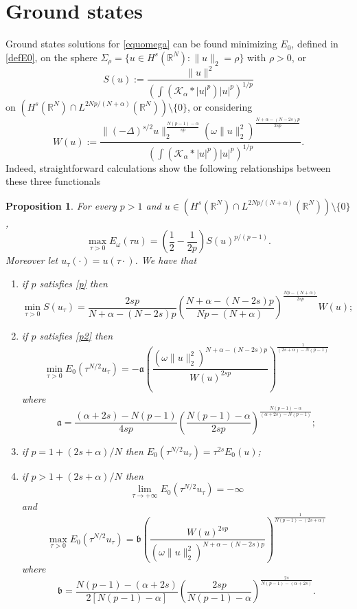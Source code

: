 \documentclass[10pt]{amsart}
\numberwithin{equation}{section}
\newtheorem{proposition}[theorem]{Proposition}
\begin{document}
\section{Ground states}
\label{sec:gs}
\noindent
Ground states solutions for \eqref{equomega} can be found minimizing $E_0$, defined in \eqref{defE0}, on the sphere $\Sigma_{\rho}=\{ u\in {H^{s}(\mathbb R^{N})} : \|u\|_{2}=\rho\}$ with $\rho>0$, or
\[
S(u):=\frac{\|u\|^{2}}
{\left(\int ({\mathcal K}_\alpha *|u|^p )|u|^{p}\right)^{1/p}}
\]
on $({H^{s}(\mathbb R^{N})}\cap L^{2Np/(N+\alpha)}(\mathbb{R}^N))\setminus\{0\}$, or considering 
\[
W(u):= 
\frac{\|(-\Delta)^{s/2} u\|_2^{\frac{N(p-1)-\alpha}{sp}}(\omega \|u\|_2^2)^\frac{N+\alpha-(N-2s)p}{2sp} }{\left(\int ({\mathcal K}_\alpha *|u|^p )|u|^{p}\right)^{1/p}}.
\]
Indeed, straightforward calculations show the following relationships between
these three functionals
\begin{proposition}
\label{mappatura1}
For every $p>1$ and $u\in ({H^{s}(\mathbb R^{N})}\cap L^{2Np/(N+\alpha)}(\mathbb{R}^N))\setminus\{0\}$, 
\[
\max_{\tau>0} E_\omega(\tau u) =\left(\frac{1}{2}-\frac{1}{2p}\right) S(u)^{p/(p-1)}.
\]
Moreover let $u_\tau(\cdot)=u(\tau\cdot)$. We have that
\begin{enumerate}[label=(\roman*),ref=\roman*]
\item if $p$ satisfies \eqref{p} then
\[
\min_{\tau>0} S(u_\tau)
=
\frac{2sp}{N+\alpha-(N-2s)p}
\left(\frac{N+\alpha-(N-2s)p}{Np - (N+\alpha)}\right)^{\frac{Np - (N+\alpha)}{2sp}} 
W(u);
\]
\item if $p$ satisfies \eqref{p2} then
\[
\min_{\tau>0} E_0(\tau^{N/2}u_\tau)
=
- \mathfrak{a}
\left(\frac{(\omega\|u\|_2^2)^{N+\alpha-(N-2s)p}}{W(u)^{2sp}}\right)^\frac{1}{(2s+\alpha)-N(p-1)}
\]
where
\[
\mathfrak{a}
=
\frac{(\alpha+2s)-N(p-1)}{4sp} \left(\frac{N(p-1)-\alpha}{2sp}\right)^\frac{N(p-1)-\alpha}{(\alpha+2s)-N(p-1)};
\]
\item if $p=1+(2s+\alpha)/N$ then $E_0(\tau^{N/2}u_\tau)=\tau^{2s}E_0(u)$;
\item if $p>1+(2s+\alpha)/N$ then
\[
\lim_{\tau\to+\infty} E_0(\tau^{N/2}u_\tau)=-\infty
\]
and
\[
\max_{\tau>0} E_0(\tau^{N/2}u_\tau)
=
\mathfrak{b}
\left(\frac{W(u)^{2sp}}{(\omega\|u\|_2^2)^{N+\alpha-(N-2s)p}}\right)^\frac{1}{N(p-1)-(2s+\alpha)}
\]
where
\[
\mathfrak{b}
=
\frac{N(p-1)-(\alpha+2s)}{2[N(p-1)-\alpha]} \left(\frac{2sp}{N(p-1)-\alpha}\right)^\frac{2s}{N(p-1)-(\alpha+2s)}.
\]
\end{enumerate}
\end{proposition}
\end{document}

